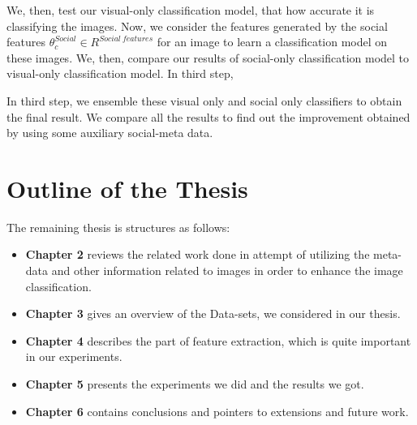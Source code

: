 	   We, then, test our visual-only classification model, that how accurate it is classifying the images. Now, we consider the  features generated by the social features $\theta_c ^{Social} \in R^{Social\ features}$ for an image to  learn a classification model on these images.  We, then, compare our results of social-only classification model to visual-only classification model. In third step, 
	   
	   In third step, we ensemble these visual only and social only classifiers to obtain the final result. We compare all the results to find out the improvement obtained by using some auxiliary social-meta data.

\section{Outline of the Thesis}
The remaining thesis is structures as follows:
\begin{itemize}
\item{{\bf Chapter 2} reviews the related work done in attempt of utilizing the meta-data and other information related to images in order to enhance the image classification.}
\item{{\bf Chapter 3} gives an overview of the Data-sets, we considered in our thesis. }
\item{{\bf Chapter 4} describes the part of feature extraction, which is quite important in our experiments.}
\item{{\bf Chapter 5} presents the experiments we did and the results we got. }
\item{{\bf Chapter 6} contains conclusions and pointers to extensions and future work. }
\end{itemize}


